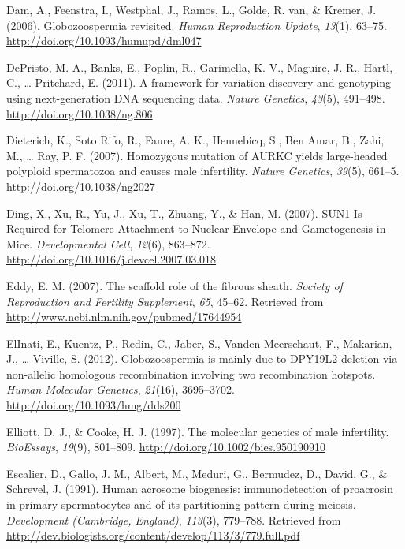 \documentclass[12pt,twoside]{reedthesis}
\theoremstyle{definition}
\theoremstyle{definition}
\theoremstyle{remark}
\begin{document}
  \hypertarget{ref-Dam2006}{}
  Dam, A., Feenstra, I., Westphal, J., Ramos, L., Golde, R. van, \&
  Kremer, J. (2006). Globozoospermia revisited. \emph{Human Reproduction
  Update}, \emph{13}(1), 63--75.
  \url{http://doi.org/10.1093/humupd/dml047}
  
  \hypertarget{ref-DePristo2011}{}
  DePristo, M. A., Banks, E., Poplin, R., Garimella, K. V., Maguire, J.
  R., Hartl, C., \ldots{} Pritchard, E. (2011). A framework for variation
  discovery and genotyping using next-generation DNA sequencing data.
  \emph{Nature Genetics}, \emph{43}(5), 491--498.
  \url{http://doi.org/10.1038/ng.806}
  
  \hypertarget{ref-Dieterich2007}{}
  Dieterich, K., Soto Rifo, R., Faure, A. K., Hennebicq, S., Ben Amar, B.,
  Zahi, M., \ldots{} Ray, P. F. (2007). Homozygous mutation of AURKC
  yields large-headed polyploid spermatozoa and causes male infertility.
  \emph{Nature Genetics}, \emph{39}(5), 661--5.
  \url{http://doi.org/10.1038/ng2027}
  
  \hypertarget{ref-Ding2007}{}
  Ding, X., Xu, R., Yu, J., Xu, T., Zhuang, Y., \& Han, M. (2007). SUN1 Is
  Required for Telomere Attachment to Nuclear Envelope and Gametogenesis
  in Mice. \emph{Developmental Cell}, \emph{12}(6), 863--872.
  \url{http://doi.org/10.1016/j.devcel.2007.03.018}
  
  \hypertarget{ref-Eddy2007}{}
  Eddy, E. M. (2007). The scaffold role of the fibrous sheath.
  \emph{Society of Reproduction and Fertility Supplement}, \emph{65},
  45--62. Retrieved from \url{http://www.ncbi.nlm.nih.gov/pubmed/17644954}
  
  \hypertarget{ref-ElInati2012}{}
  ElInati, E., Kuentz, P., Redin, C., Jaber, S., Vanden Meerschaut, F.,
  Makarian, J., \ldots{} Viville, S. (2012). Globozoospermia is mainly due
  to DPY19L2 deletion via non-allelic homologous recombination involving
  two recombination hotspots. \emph{Human Molecular Genetics},
  \emph{21}(16), 3695--3702. \url{http://doi.org/10.1093/hmg/dds200}
  
  \hypertarget{ref-Elliott1997}{}
  Elliott, D. J., \& Cooke, H. J. (1997). The molecular genetics of male
  infertility. \emph{BioEssays}, \emph{19}(9), 801--809.
  \url{http://doi.org/10.1002/bies.950190910}
  
  \hypertarget{ref-Escalier1991}{}
  Escalier, D., Gallo, J. M., Albert, M., Meduri, G., Bermudez, D., David,
  G., \& Schrevel, J. (1991). Human acrosome biogenesis: immunodetection
  of proacrosin in primary spermatocytes and of its partitioning pattern
  during meiosis. \emph{Development (Cambridge, England)}, \emph{113}(3),
  779--788. Retrieved from
  \url{http://dev.biologists.org/content/develop/113/3/779.full.pdf}
  
\end{document}
